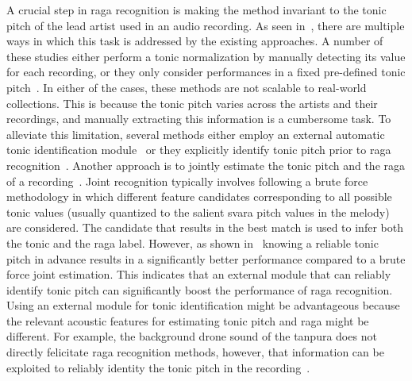 A crucial step in \gls{raga} recognition is making the method invariant to the tonic pitch of the lead artist used in an audio recording. As seen in~, there are multiple ways in which this task is addressed by the existing approaches. A number of these studies either perform a tonic normalization by manually detecting its value for each recording, or they only consider performances in a fixed pre-defined tonic pitch~\citep{pandey2003tansen,chordia2007raag,belle2009raga,Shetty2009}. In either of the cases, these methods are not scalable to real-world collections. This is because the tonic pitch varies across the artists and their recordings, and manually extracting this information is a cumbersome task. To alleviate this limitation, several methods either employ an external automatic tonic identification module~\citep{koduri2012raga,koduri2014intonation} or they explicitly identify tonic pitch prior to \gls{raga} recognition~\citep{ranjani2011carnatic,chakraborty2012object}. Another approach is to jointly estimate the tonic pitch and the \gls{raga} of a recording~\citep{chordia2013joint,koduri2011survey,kumar2014identifying}. Joint recognition typically involves following a brute force methodology in which different feature candidates corresponding to all possible tonic values (usually quantized to the salient \gls{svara} pitch values in the melody) are considered. The candidate that results in the best match is used to infer both the tonic and the \gls{raga} label. However, as shown in~\cite{chordia2013joint} knowing a reliable tonic pitch in advance results in a significantly better performance compared to a brute force joint estimation. This indicates that an external module that can reliably identify tonic pitch can significantly boost the performance of \gls{raga} recognition. Using an external module for tonic identification might be advantageous because the relevant acoustic features for estimating tonic pitch and \gls{raga} might be different. For example, the background drone sound of the \gls{tanpura} does not directly felicitate \gls{raga} recognition methods, however, that information can be exploited to reliably identity the tonic pitch in the recording~\citep{Gulati2014Tonic}.

